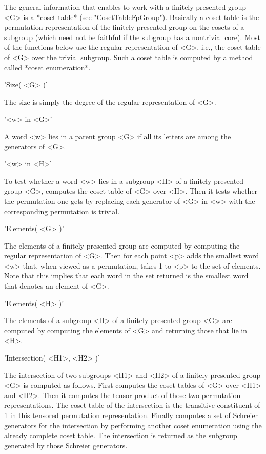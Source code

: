 The  general  information that  enables {\GAP} to  work  with a  finitely
presented  group  <G>  is  a  *coset  table*  (see  "CosetTableFpGroup").
Basically a coset table is the permutation representation of the finitely
presented group on the cosets of a  subgroup (which need  not be faithful
if the subgroup has a  nontrivial core).  Most of the functions below use
the regular representation of <G>, i.e., the coset table  of <G> over the
trivial subgroup.  Such  a coset  table is computed  by a  method  called
*coset enumeration*.

\vspace{5mm}
'Size( <G> )'%

The size is simply the degree of the regular representation of <G>.

\vspace{5mm}
'<w> in <G>'%

A word <w> lies  in a parent  group <G> if  all its letters are among the
generators of <G>.

\vspace{5mm}
'<w> in <H>'

To test whether a word <w> lies in a subgroup <H> of a finitely presented
group <G>, {\GAP}  computes the  coset table of <G> over  <H>.   Then  it
tests whether the permutation one gets by replacing each generator of <G>
in <w> with the corresponding permutation is trivial.

\vspace{5mm}
'Elements( <G> )'%

The elements of a finitely presented  group are computed by computing the
regular representation of <G>.  Then for  each  point <p> {\GAP} adds the
smallest word <w> that, when viewed  as a permutation, takes  1 to <p> to
the set of elements.  Note that this implies  that each word in  the  set
returned is the smallest word that denotes an element of <G>.

\vspace{5mm}
'Elements( <H> )'

The elements  of  a  subgroup <H> of a  finitely presented group  <G> are
computed by computing the elements of <G> and returning those that lie in
<H>.

\vspace{5mm}
'Intersection( <H1>, <H2> )'%

The intersection of two subgroups <H1> and  <H2>  of a finitely presented
group <G> is computed as follows.  First {\GAP} computes the coset tables
of <G> over <H1> and <H2>.  Then it computes the tensor product  of those
two permutation representations.  The coset table of the  intersection is
the   transitive   constituent   of   1  in   this  tensored  permutation
representation.  Finally {\GAP} computes a set of Schreier generators for
the  intersection  by  performing  another coset  enumeration  using  the
already complete  coset  table.   The intersection  is  returned  as  the
subgroup generated by those Schreier generators.

